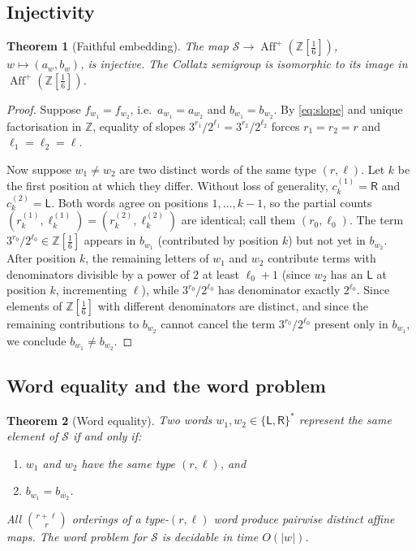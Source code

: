 \documentclass[12pt, a4paper]{amsart}
\theoremstyle{plain}
\newtheorem{theorem}{Theorem}[section]
\theoremstyle{definition}
\theoremstyle{remark}
\newcommand{\Z}{\mathbb{Z}}
\newcommand{\Zs}{\Z[\tfrac{1}{6}]}
\newcommand{\Aff}{\operatorname{Aff}}
\newcommand{\wL}{\mathsf{L}}
\newcommand{\wR}{\mathsf{R}}
\begin{document}
\subsection{Injectivity}

\begin{theorem}[Faithful embedding]
  \label{thm:faithful}
  The map $\mathcal{S}\to\Aff^+(\Zs)$, $w\mapsto (a_w,b_w)$, is
  injective.  The Collatz semigroup is isomorphic to its image in
  $\Aff^+(\Zs)$.
\end{theorem}

\begin{proof}
  Suppose $f_{w_1}=f_{w_2}$, i.e.\ $a_{w_1}=a_{w_2}$ and
  $b_{w_1}=b_{w_2}$.  By \eqref{eq:slope} and unique factorisation in
  $\Z$, equality of slopes $3^{r_1}/2^{\ell_1}=3^{r_2}/2^{\ell_2}$
  forces $r_1=r_2=r$ and $\ell_1=\ell_2=\ell$.

  Now suppose $w_1\neq w_2$ are two distinct words of the same type
  $(r,\ell)$.  Let $k$ be the first position at which they differ.
  Without loss of generality, $c_k^{(1)}=\wR$ and $c_k^{(2)}=\wL$.
  Both words agree on positions $1,\ldots,k-1$, so the partial counts
  $(r_{k}^{(1)}, \ell_{k}^{(1)}) = (r_{k}^{(2)}, \ell_{k}^{(2)})$
  are identical; call them $(r_0,\ell_0)$.  The term
  $3^{r_0}/2^{\ell_0}\in\Zs$ appears in $b_{w_1}$ (contributed by
  position $k$) but not yet in $b_{w_2}$.  After position $k$, the
  remaining letters of $w_1$ and $w_2$ contribute terms with
  denominators divisible by a power of $2$ at least $\ell_0+1$ (since
  $w_2$ has an $\wL$ at position $k$, incrementing $\ell$), while
  $3^{r_0}/2^{\ell_0}$ has denominator exactly $2^{\ell_0}$.  Since
  elements of $\Zs$ with different denominators are distinct, and since
  the remaining contributions to $b_{w_2}$ cannot cancel the term
  $3^{r_0}/2^{\ell_0}$ present only in $b_{w_1}$, we conclude
  $b_{w_1}\neq b_{w_2}$.
\end{proof}

\subsection{Word equality and the word problem}

\begin{theorem}[Word equality]
  \label{thm:word-equality}
  Two words $w_1, w_2\in\{\wL,\wR\}^*$ represent the same element of
  $\mathcal{S}$ if and only if:
  \begin{enumerate}[label=\textup{(\roman*)}]
    \item $w_1$ and $w_2$ have the same type $(r,\ell)$, and
    \item $b_{w_1} = b_{w_2}$.
  \end{enumerate}
  All $\binom{r+\ell}{r}$ orderings of a type-$(r,\ell)$ word produce
  pairwise distinct affine maps.  The word problem for $\mathcal{S}$ is
  decidable in time $O(|w|)$.
\end{theorem}
\end{document}

